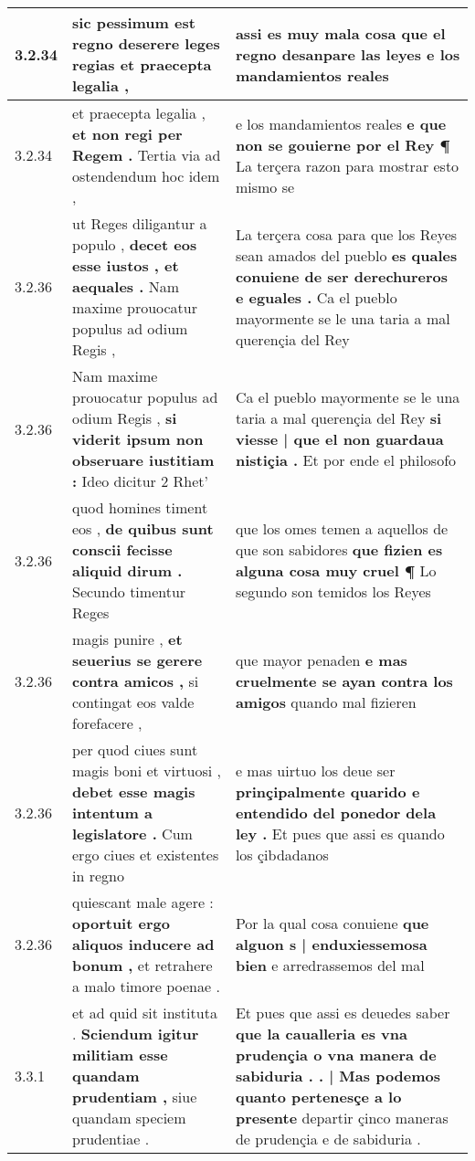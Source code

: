 \begin{tabular}{|p{1cm}|p{6.5cm}|p{6.5cm}|}
3.2.34 & sic pessimum est regno \textbf{ deserere leges regias } et praecepta legalia , & assi es muy mala cosa \textbf{ que el regno desanpare las leyes } e los mandamientos reales \\\hline
3.2.34 & et praecepta legalia , \textbf{ et non regi per Regem . } Tertia via ad ostendendum hoc idem , & e los mandamientos reales \textbf{ e que non se gouierne por el Rey ¶ } La terçera razon para mostrar esto mismo se \\\hline
3.2.36 & ut Reges diligantur a populo , \textbf{ decet eos esse iustos , et aequales . } Nam maxime prouocatur populus ad odium Regis , & La terçera cosa para que los Reyes sean amados del pueblo \textbf{ es quales conuiene de ser derechureros e eguales . } Ca el pueblo mayormente se le una taria a mal querençia del Rey \\\hline
3.2.36 & Nam maxime prouocatur populus ad odium Regis , \textbf{ si viderit ipsum non obseruare iustitiam : } Ideo dicitur 2 Rhet’ & Ca el pueblo mayormente se le una taria a mal querençia del Rey \textbf{ si viesse | que el non guardaua nistiçia . } Et por ende el philosofo \\\hline
3.2.36 & quod homines timent eos , \textbf{ de quibus sunt conscii fecisse aliquid dirum . } Secundo timentur Reges & que los omes temen a aquellos de que son sabidores \textbf{ que fizien es alguna cosa muy cruel ¶ } Lo segundo son temidos los Reyes \\\hline
3.2.36 & magis punire , \textbf{ et seuerius se gerere contra amicos , } si contingat eos valde forefacere , & que mayor penaden \textbf{ e mas cruelmente se ayan contra los amigos } quando mal fizieren \\\hline
3.2.36 & per quod ciues sunt magis boni et virtuosi , \textbf{ debet esse magis intentum a legislatore . } Cum ergo ciues et existentes in regno & e mas uirtuo los deue ser \textbf{ prinçipalmente quarido e entendido del ponedor dela ley . } Et pues que assi es quando los çibdadanos \\\hline
3.2.36 & quiescant male agere : \textbf{ oportuit ergo aliquos inducere ad bonum , } et retrahere a malo timore poenae . & Por la qual cosa conuiene \textbf{ que alguon s | enduxiessemosa bien } e arredrassemos del mal \\\hline
3.3.1 & et ad quid sit instituta . \textbf{ Sciendum igitur militiam esse quandam prudentiam , } siue quandam speciem prudentiae . & Et pues que assi es deuedes saber \textbf{ que la caualleria es vna prudençia o vna manera de sabiduria . . | Mas podemos quanto pertenesçe a lo presente } departir çinco maneras de prudençia e de sabiduria . \\\hline

\end{tabular}
